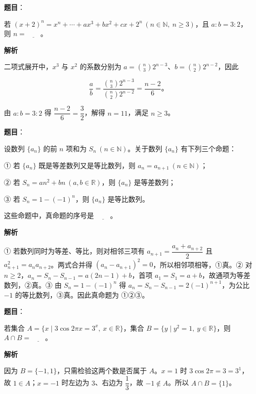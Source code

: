 \begin{answer}

\textbf{题目}：

若 $(x+2)^n=x^n+\cdots+ax^3+bx^2+cx+2^n\ (n\in\mathbb N,\ n\ge3)$，且 $a:b=3:2$，则 $n=\underline{\qquad}$。

\textbf{解析}

二项式展开中，$x^3$ 与 $x^2$ 的系数分别为 $a=\binom n3 2^{n-3}$、$b=\binom n2 2^{n-2}$，因此

\nopagebreak[4]
\[
\frac ab=\frac{\binom n3 2^{n-3}}{\binom n2 2^{n-2}}=\frac{n-2}{6}\text{。}
\]

由 $a:b=3:2$ 得 $\dfrac{n-2}{6}=\dfrac32$，解得 $n=11$，满足 $n\geqslant3$。


\end{answer}
\begin{answer}

\textbf{题目}：

设数列 $\{a_n\}$ 的前 $n$ 项和为 $S_n\ (n\in\mathbb N)$。关于数列 $\{a_n\}$ 有下列三个命题：

① 若 $\{a_n\}$ 既是等差数列又是等比数列，则 $a_n=a_{n+1}\ (n\in\mathbb N)$；

② 若 $S_n=an^2+bn\ (a,b\in\mathbb R)$，则 $\{a_n\}$ 是等差数列；

③ 若 $S_n=1-(-1)^n$，则 $\{a_n\}$ 是等比数列。

这些命题中，真命题的序号是 $\underline{\qquad}$。

\textbf{解析}

① 若数列同时为等差、等比，则对相邻三项有 $a_{n+1}=\dfrac{a_n+a_{n+2}}2$ 且 $a_{n+1}^2=a_na_{n+2}$。两式合并得 $(a_n-a_{n+1})^2=0$，所以相邻项相等，①真。② 对 $n\ge2$，$a_n=S_n-S_{n-1}=a(2n-1)+b$，首项 $a_1=S_1=a+b$，故通项为等差数列，②真。③ 由 $S_n=1-(-1)^n$ 得 $a_n=S_n-S_{n-1}=2(-1)^{n+1}$，为公比 $-1$ 的等比数列，③真。因此真命题为 ①②③。


\end{answer}
\begin{answer}

\textbf{题目}：

若集合 $A=\{x\mid 3\cos 2\pi x=3^x,\ x\in\mathbb R\}$，集合 $B=\{y\mid y^2=1,\ y\in\mathbb R\}$，则 $A\cap B=\underline{\qquad}$。

\textbf{解析}

因为 $B=\{-1,1\}$，只需检验这两个数是否属于 $A$。$x=1$ 时 $3\cos2\pi=3=3^1$，故 $1\in A$；$x=-1$ 时左边为 $3$、右边为 $\dfrac13$，故 $-1\notin A$。所以 $A\cap B=\{1\}$。


\end{answer}
